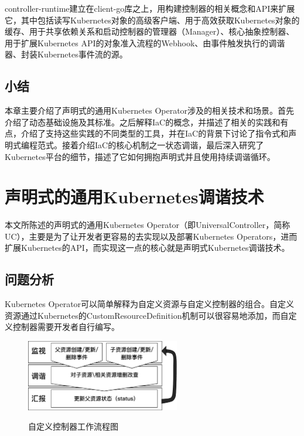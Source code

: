 \documentclass[macfonts,master]{njuthesis}
\begin{document}
controller-runtime建立在client-go库之上，用构建控制器的相关概念和API来扩展它，其中包括读写Kubernetes对象的高级客户端、用于高效获取Kubernetes对象的缓存、用于共享依赖关系和启动控制器的管理器（Manager）、核心抽象控制器、用于扩展Kubernetes API的对象准入流程的Webhook、由事件触发执行的调谐器、封装Kubernetes事件流的源\cite{k8s-sigs}。



\section{小结}
本章主要介绍了声明式的通用Kubernetes Operator涉及的相关技术和场景。首先介绍了动态基础设施及其标准。之后解释IaC的概念，并描述了相关的实践和有点，介绍了支持这些实践的不同类型的工具，并在IaC的背景下讨论了指令式和声明式编程范式。接着介绍IaC的核心机制之一状态调谐，最后深入研究了Kubernetes平台的细节，描述了它如何拥抱声明式并且使用持续调谐循环。

\chapter{声明式的通用Kubernetes调谐技术}\label{chapter_framework}
本文所陈述的声明式的通用Kubernetes Operator（即UniversalController，简称UC），主要是为了让开发者更容易的去实现以及部署Kubernetes Operators，进而扩展Kubernetes的API，而实现这一点的核心就是声明式Kubernetes调谐技术。

\section{问题分析}

Kubernetes Operator可以简单解释为自定义资源与自定义控制器的组合。自定义资源通过Kubernetes的CustomResourceDefinition机制可以很容易地添加，而自定义控制器需要开发者自行编写。

\begin{figure}[htbp]
  \centering
  \includegraphics[width=0.6\textwidth]{pics/Operator-Principles.pdf}\\
  \caption{自定义控制器工作流程图}\label{fig:Operator-Principles}
\end{figure}
\end{document}
